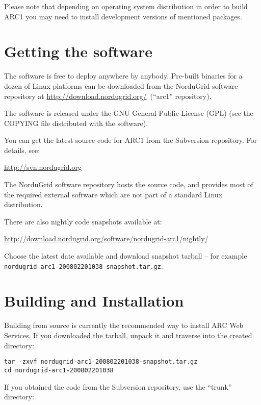 \documentclass{article}                            %
\newcommand{\ngdl}{\url{http://download.nordugrid.org/}~}
\begin{document}
\begin{framed}
Please note that depending on operating system distribution in order to build
ARC1 you may need to install development versions of mentioned packages.
\end{framed}

\section{Getting the software}
\label{sec:download}

The software is free to deploy anywhere by anybody. Pre-built binaries for a
dozen of Linux platforms can be downloaded from the NorduGrid software
repository at \ngdl (``arc1'' repository).

The software is released under the GNU General Public License (GPL) (see the
COPYING file distributed with the software).

You can get the latest source code for ARC1 from the Subversion repository.
For details, see:

\url{http://svn.nordugrid.org}

The NorduGrid software repository hosts the source code, and provides most of
the required external software which are not part of a standard Linux
distribution.

There are also nightly code snapshots available at:

\url{http://download.nordugrid.org/software/nordugrid-arc1/nightly/}

Choose the latest date available and download snapshot tarball -- for example\\
\verb|nordugrid-arc1-200802201038-snapshot.tar.gz|.

\section{Building and Installation}
\label{sec:build}

Building from source is currently the recommended way to install ARC Web
Services. If you downloaded the tarball, unpack it and traverse into the created
directory:

\begin{lstlisting}
tar -zxvf nordugrid-arc1-200802201038-snapshot.tar.gz
cd nordugrid-arc1-200802201038
\end{lstlisting}

If you obtained the code from the Subversion repository, use the ``trunk''
directory:
\end{document}
